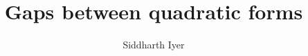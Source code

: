 \documentclass[12pt]{amsart}
\newcommand{\1}{\mathmybb{1}}
\begin{document}
\def\NmQR{N(m;Q,R)}
\def\VmQR{\cV(m;Q,R)}

\def\Xm{\cX_{p,m}}

\def \A {{\mathbb A}}
\def \B {{\mathbb A}}
\def \C {{\mathbb C}}
\def \F {{\mathbb F}}
\def \G {{\mathbb G}}
\def \L {{\mathbb L}}
\def \K {{\mathbb K}}
\def \N {{\mathbb N}}
\def \PP {{\mathbb P}}
\def \Q {{\mathbb Q}}
\def \R {{\mathbb R}}
\def \Z {{\mathbb Z}}
\def \fS{\mathfrak S}
\def \fB{\mathfrak B}

\def\Fq{\F_q}
\def\Fqr{\F_{q^r}} 
\def\ovFq{\overline{\F_q}}
\def\ovFp{\overline{\F_p}}
\def\GL{\operatorname{GL}}
\def\SL{\operatorname{SL}}
\def\PGL{\operatorname{PGL}}
\def\PSL{\operatorname{PSL}}
\def\li{\operatorname{li}}
\def\sym{\operatorname{sym}}

\def\Mob{M{\"o}bius }

\def\fF{\EuScript{F}}
\def\M{\mathsf {M}}
\def\T{\mathsf {T}}


\def\e{{\mathbf{\,e}}}
\def\ep{{\mathbf{\,e}}_p}
\def\eq{{\mathbf{\,e}}_q}

\def\\{\cr}
\def\({\left(}
\def\){\right)}

\def\<{\left(\!\!\left(}
\def\>{\right)\!\!\right)}
\def\fl#1{\left\lfloor#1\right\rfloor}
\def\rf#1{\left\lceil#1\right\rceil}

\def\Tr{{\mathrm{Tr}}}
\def\Nm{{\mathrm{Nm}}}
\def\Im{{\mathrm{Im}}}

\def \oF {\overline \F}

\newcommand{\pfrac}[2]{{\left(\frac{#1}{#2}\right)}}
\newcommand\numberthis{\addtocounter{equation}{1}\tag{\theequation}}

\def \Prob{{\mathrm {}}}
\def\e{\mathbf{e}}
\def\ep{{\mathbf{\,e}}_p}
\def\epp{{\mathbf{\,e}}_{p^2}}
\def\em{{\mathbf{\,e}}_m}

\def\Res{\mathrm{Res}}
\def\Orb{\mathrm{Orb}}

\def\vec#1{\mathbf{#1}}
\def \va{\vec{a}}
\def \vb{\vec{b}}
\def \vh{\vec{h}}
\def \vk{\vec{k}}
\def \vs{\vec{s}}
\def \vu{\vec{u}}
\def \vv{\vec{v}}
\def \vz{\vec{z}}
\def\flp#1{{\left\langle#1\right\rangle}_p}
\def\T {\mathsf {T}}

\def\sfG {\mathsf {G}}
\def\sfK {\mathsf {K}}

\def\mand{\qquad\mbox{and}\qquad}


\title[Gaps between quadratic forms]
{Gaps between quadratic forms}

\author[Siddharth Iyer] {Siddharth Iyer}
\address{School of Mathematics and Statistics, University of New South Wales, Sydney, NSW 2052, Australia}
\end{document}
